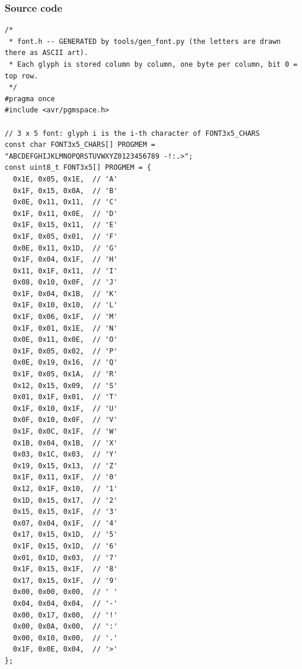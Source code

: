 \documentclass[11pt,a4paper]{article}
\begin{document}
\subsubsection*{Source code}
\begin{lstlisting}[language=Arduino]
/*
 * font.h -- GENERATED by tools/gen_font.py (the letters are drawn there as ASCII art).
 * Each glyph is stored column by column, one byte per column, bit 0 = top row.
 */
#pragma once
#include <avr/pgmspace.h>

// 3 x 5 font: glyph i is the i-th character of FONT3x5_CHARS
const char FONT3x5_CHARS[] PROGMEM = "ABCDEFGHIJKLMNOPQRSTUVWXYZ0123456789 -!:.>";
const uint8_t FONT3x5[] PROGMEM = {
  0x1E, 0x05, 0x1E,  // 'A'
  0x1F, 0x15, 0x0A,  // 'B'
  0x0E, 0x11, 0x11,  // 'C'
  0x1F, 0x11, 0x0E,  // 'D'
  0x1F, 0x15, 0x11,  // 'E'
  0x1F, 0x05, 0x01,  // 'F'
  0x0E, 0x11, 0x1D,  // 'G'
  0x1F, 0x04, 0x1F,  // 'H'
  0x11, 0x1F, 0x11,  // 'I'
  0x08, 0x10, 0x0F,  // 'J'
  0x1F, 0x04, 0x1B,  // 'K'
  0x1F, 0x10, 0x10,  // 'L'
  0x1F, 0x06, 0x1F,  // 'M'
  0x1F, 0x01, 0x1E,  // 'N'
  0x0E, 0x11, 0x0E,  // 'O'
  0x1F, 0x05, 0x02,  // 'P'
  0x0E, 0x19, 0x16,  // 'Q'
  0x1F, 0x05, 0x1A,  // 'R'
  0x12, 0x15, 0x09,  // 'S'
  0x01, 0x1F, 0x01,  // 'T'
  0x1F, 0x10, 0x1F,  // 'U'
  0x0F, 0x10, 0x0F,  // 'V'
  0x1F, 0x0C, 0x1F,  // 'W'
  0x1B, 0x04, 0x1B,  // 'X'
  0x03, 0x1C, 0x03,  // 'Y'
  0x19, 0x15, 0x13,  // 'Z'
  0x1F, 0x11, 0x1F,  // '0'
  0x12, 0x1F, 0x10,  // '1'
  0x1D, 0x15, 0x17,  // '2'
  0x15, 0x15, 0x1F,  // '3'
  0x07, 0x04, 0x1F,  // '4'
  0x17, 0x15, 0x1D,  // '5'
  0x1F, 0x15, 0x1D,  // '6'
  0x01, 0x1D, 0x03,  // '7'
  0x1F, 0x15, 0x1F,  // '8'
  0x17, 0x15, 0x1F,  // '9'
  0x00, 0x00, 0x00,  // ' '
  0x04, 0x04, 0x04,  // '-'
  0x00, 0x17, 0x00,  // '!'
  0x00, 0x0A, 0x00,  // ':'
  0x00, 0x10, 0x00,  // '.'
  0x1F, 0x0E, 0x04,  // '>'
};


\end{lstlisting}
\end{document}
